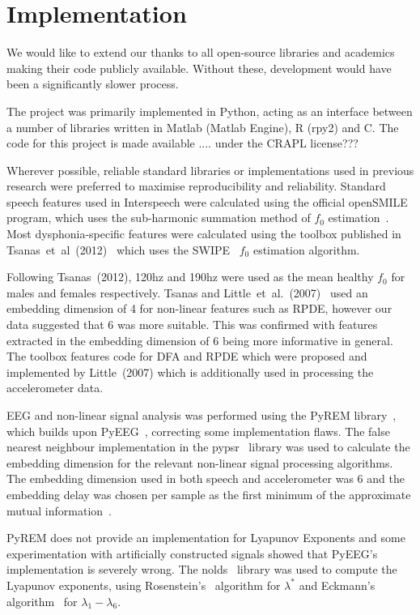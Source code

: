 \documentclass[12pt, twoside]{book}
\begin{document}
\section{Implementation}
\label{implementation}
We would like to extend our thanks to all open-source libraries and academics making their code publicly available. Without these, development would have been a significantly slower process. 

The project was primarily implemented in Python, acting as an interface between a number of libraries written in Matlab (Matlab Engine), R (rpy2) and C. The code for this project is made available .... under the CRAPL license???

Wherever possible, reliable standard libraries or implementations used in previous research were preferred to maximise reproducibility and reliability. Standard speech features used in Interspeech were calculated using the official openSMILE~\cite{opensmile} program, which uses the sub-harmonic summation method of $f_0$ estimation~\cite{shs}. Most dysphonia-specific features were calculated using the toolbox published in Tsanas~et~al~(2012)~\cite{spoverview} which uses the SWIPE~\cite{camacho2007swipe,f0estimation} $f_0$ estimation algorithm. 

Following Tsanas~(2012), 120hz and 190hz were used as the mean healthy $f_0$ for males and females respectively. Tsanas and Little~et~al.~(2007)~\cite{splittlenonlinear2007} used an embedding dimension of 4 for non-linear features such as RPDE, however our data suggested that 6 was more suitable. This was confirmed with features extracted in the embedding dimension of 6 being more informative in general. The toolbox features code for DFA and RPDE which were proposed and implemented by Little~(2007) which is additionally used in processing the accelerometer data.

EEG and non-linear signal analysis was performed using the PyREM library~\cite{pyrem}, which builds upon PyEEG~\cite{pyeeg}, correcting some implementation flaws. The false nearest neighbour implementation in the pypsr~\cite{pypsr} library was used to calculate the embedding dimension for the relevant non-linear signal processing algorithms. The embedding dimension used in both speech and accelerometer was 6 and the embedding delay was chosen per sample as the first minimum of the approximate mutual information~\cite{rosenstein1993practicallyapunov}.
 
PyREM does not provide an implementation for Lyapunov Exponents and some experimentation with artificially constructed signals showed that PyEEG's implementation is severely wrong. The nolds~\cite{nolds} library was used to compute the Lyapunov exponents, using Rosenstein's~\cite{rosenstein1993practicallyapunov} algorithm for $\lambda^*$ and Eckmann's algorithm~\cite{eckmann1986liapunov} for $\lambda_1 - \lambda_6$.
  
\end{document}
